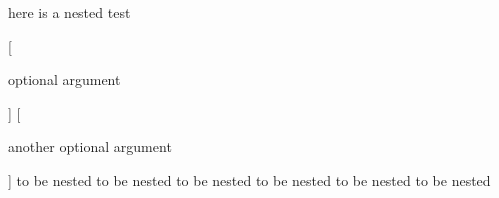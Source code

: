 here is a nested test
\begin{one}

	[

		optional argument

	]
	[


		another optional argument


	]
	to be nested to be nested
	to be nested to be nested
	to be nested to be nested
\end{one}
